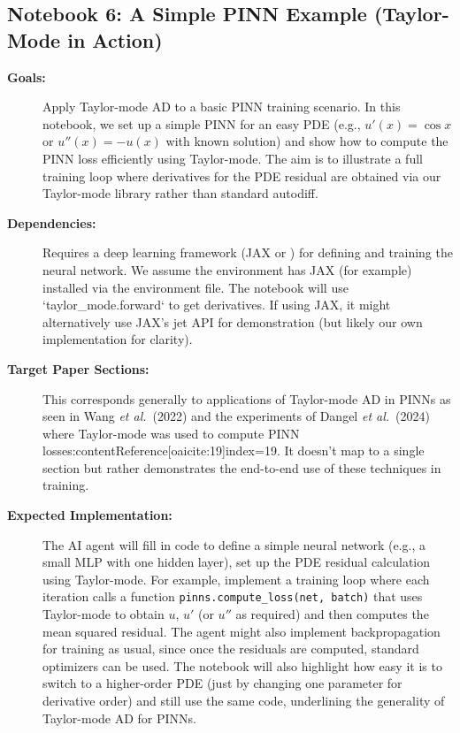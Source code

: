\documentclass[11pt]{article}
\begin{document}
\subsection{Notebook 6: A Simple PINN Example (Taylor-Mode in Action)}
\begin{description}
  \item[\textbf{Goals:}] Apply Taylor-mode AD to a basic PINN training scenario. In this notebook, we set up a simple PINN for an easy PDE (e.g., $u'(x) = \cos x$ or $u''(x) = -u(x)$ with known solution) and show how to compute the PINN loss efficiently using Taylor-mode. The aim is to illustrate a full training loop where derivatives for the PDE residual are obtained via our Taylor-mode library rather than standard autodiff.
  \item[\textbf{Dependencies:}] Requires a deep learning framework (JAX or ) for defining and training the neural network. We assume the environment has JAX (for example) installed via the environment file. The notebook will use `taylor_mode.forward` to get derivatives. If using JAX, it might alternatively use JAX's jet API for demonstration (but likely our own implementation for clarity).
  \item[\textbf{Target Paper Sections:}] This corresponds generally to applications of Taylor-mode AD in PINNs as seen in Wang \textit{et al.}\ (2022) and the experiments of Dangel \textit{et al.}\ (2024) where Taylor-mode was used to compute PINN losses:contentReference[oaicite:19]{index=19}. It doesn't map to a single section but rather demonstrates the end-to-end use of these techniques in training.
  \item[\textbf{Expected Implementation:}] The AI agent will fill in code to define a simple neural network (e.g., a small MLP with one hidden layer), set up the PDE residual calculation using Taylor-mode. For example, implement a training loop where each iteration calls a function \texttt{pinns.compute\_loss(net, batch)} that uses Taylor-mode to obtain $u$, $u'$ (or $u''$ as required) and then computes the mean squared residual. The agent might also implement backpropagation for training as usual, since once the residuals are computed, standard optimizers can be used. The notebook will also highlight how easy it is to switch to a higher-order PDE (just by changing one parameter for derivative order) and still use the same code, underlining the generality of Taylor-mode AD for PINNs.
\end{description}
\end{document}
